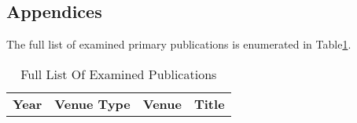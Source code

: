 \begin{appendices}
\renewcommand{\thetable}{A\arabic{table}}
\section{Appendices}
The full list of examined primary publications is enumerated in Table\ref{tab:flep}.

\begin{table}[ht!]
\caption{Full List Of Examined Publications
\label{tab:flep}}
\begin{adjustbox}{width=\linewidth, center}
\centering
\begin{tabular}{llll}
\toprule
\textbf{Year} & \textbf{Venue Type} & \textbf{Venue}               & \textbf{Title}              \\


\end{tabular}
\end{adjustbox}
\end{table}
\end{appendices}
